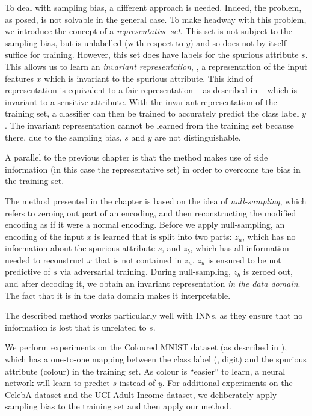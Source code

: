 To deal with sampling bias, a different approach is needed.
Indeed, the problem, as posed, is not solvable in the general case.
To make headway with this problem, we introduce the concept of a \emph{representative set}.
This set is not subject to the sampling bias,
but is unlabelled (with respect to $y$) and so does not by itself suffice for training.
However, this set does have labels for the spurious attribute \(s\).
This allows us to learn an \emph{invariant representation},
\ie, a representation of the input features \(x\) which is invariant to the spurious attribute.
This kind of representation is equivalent to a fair representation -- as described in  --
which is invariant to a sensitive attribute.
With the invariant representation of the training set,
a classifier can then be trained to accurately predict the class label \(y\).
The invariant representation cannot be learned from the training set
because there, due to the sampling bias, \(s\) and \(y\) are not distinguishable.

A parallel to the previous chapter is that the method makes use of side information
(in this case the representative set)
in order to overcome the bias in the training set.

The method presented in the chapter is based on the idea of \emph{null-sampling},
which refers to zeroing out part of an encoding,
and then reconstructing the modified encoding as if it were a normal encoding.
Before we apply null-sampling, an encoding of the input \(x\) is learned that is split into two parts:
\(z_u\), which has no information about the spurious attribute \(s\),
and \(z_b\), which has all information needed to reconstruct \(x\) that is not contained in \(z_u\).
\(z_u\) is ensured to be not predictive of \(s\) via adversarial training.
During null-sampling, \(z_b\) is zeroed out, and after decoding it,
we obtain an invariant representation \emph{in the data domain}.
The fact that it is in the data domain makes it interpretable.

The described method works particularly well with \acp{INN},
as they ensure that no information is lost that is unrelated to \(s\).

We perform experiments on the Coloured MNIST dataset (as described in ),
which has a one-to-one mapping between the class label (\ie, digit) and the spurious attribute (colour)
in the training set.
As colour is ``easier'' to learn, a neural network will learn to predict \(s\) instead of \(y\).
For additional experiments on the CelebA dataset and the UCI Adult Income dataset,
we deliberately apply sampling bias to the training set and then apply our method.

